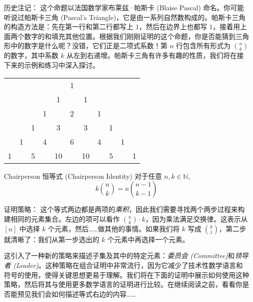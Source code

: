 \begin{questions}{历史注记：}
    这个命题以法国数学家布莱兹·帕斯卡 (Blaise Pascal) 命名。你可能听说过帕斯卡三角 (Pascal's Triangle)，它是由一系列自然数构成的。帕斯卡三角的构造方法是：先在第一行和第二行都写上 $1$，然后在边界上也都写 $1$，接着用上面两个数字的和填充其他位置。根据我们刚刚证明的这个命题，你是否能猜到三角形中的数字是什么呢？没错，它们正是二项式系数！第 $n$ 行包含所有形式为 ${n \choose k}$ 的数字，其中系数 $k$ 从左到右递增。帕斯卡三角有许多有趣的性质，我们将在接下来的示例和练习中深入探讨。

    \begin{center}
        \Large\begin{tabular}{ccccccccccc}
              &   &   &   &    & 1 &    &   &   &   &   \\
              &   &   &   & 1  &   & 1  &   &   &   &   \\
              &   &   & 1 &    & 2 &    & 1 &   &   &   \\
              &   & 1 &   & 3  &   & 3  &   & 1 &   &   \\
              & 1 &   & 4 &    & 6 &    & 4 &   & 1 &   \\
            1 &   & 5 &   & 10 &   & 10 &   & 5 &   & 1 \\
        \end{tabular}
    \end{center}
\end{questions}

\begin{proposition}{Chairperson 恒等式 (Chairperson Identity)}
    对于任意 $n,k \in \mathbb{N}$,
    \[k{n \choose k}=n{n-1 \choose k-1}\]
\end{proposition}

\begin{questions}{证明策略：}
    这个等式两边都是两项的\emph{乘积}，因此我们需要寻找两个两步过程来构建相同的元素集合。左边的项可以看作 ${n \choose k} \cdot k$，因为乘法满足交换律。这表示从 $[n]$ 中选择 $k$ 个元素，然后……做其他的事情。如果我们将 $k$ 写成 ${k \choose 1}$，第二步就清晰了：我们从第一步选出的 $k$ 个元素中再选择一个元素。

    这引入了一种新的策略来描述子集及其中的特定元素：\emph{委员会 (Committee)}和\emph{领导者 (Leader)}。这种策略在组合证明中非常流行，因为它减少了技术性数学语言和符号的使用，使得关键思想更易于理解。我们将在下面的证明中展示如何使用这种策略，然后将其与使用更多数学语言的证明进行比较。在继续阅读之前，看看你是否能预见我们会如何描述等式右边的内容……
\end{questions}

